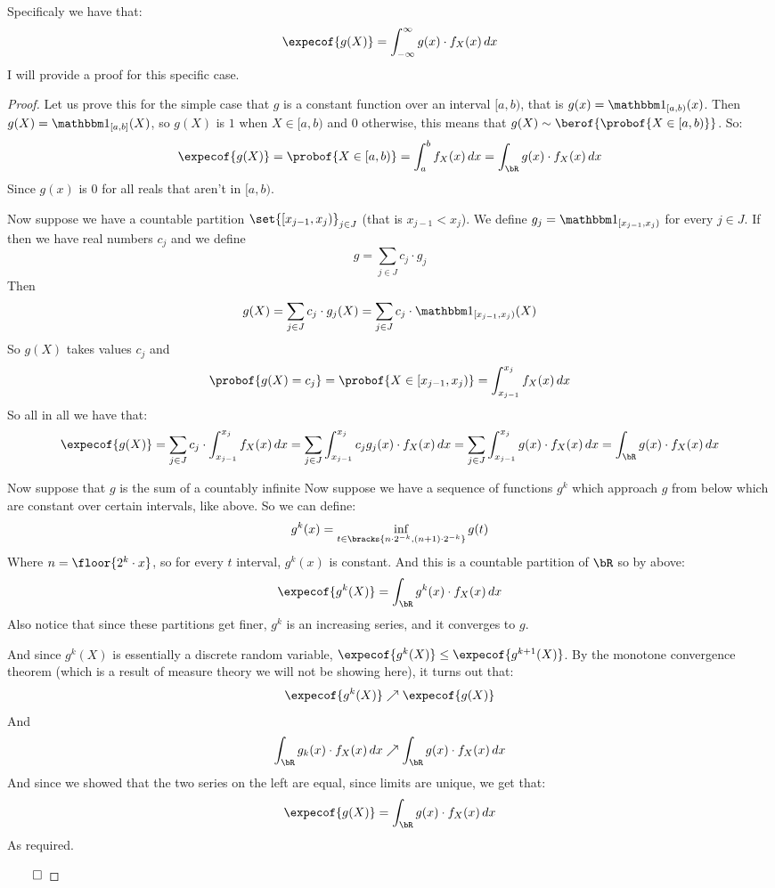 Specificaly we have that:
\[ \expecof{g(X)} = \int_{-\infty}^\infty g(x)\cdot f_X(x)\,dx \]
I will provide a proof for this specific case.

\begin{proof}

	Let us prove this for the simple case that $g$ is a constant function over an interval $[a,b)$, that is $g(x)=\bone_{[a,b)}(x)$.
	Then $g(X)=\bone_{[a,b]}(X)$, so $g(X)$ is $1$ when $X\in[a,b)$ and $0$ otherwise, this means that $g(X)\sim\berof{\probof{X\in[a,b)}}$.
	So:
	\[ \expecof{g(X)} = \probof{X\in[a,b)} = \int_a^b f_X(x)\,dx = \int_\bR g(x)\cdot f_X(x)\,dx \]
	Since $g(x)$ is $0$ for all reals that aren't in $[a,b)$.

	Now suppose we have a countable partition $\set{[x_{j-1},x_j)}_{j\in J}$ (that is $x_{j-1}<x_j$).
	We define $g_j=\bone_{[x_{j-1},x_j)}$ for every $j\in J$.
	If then we have real numbers $c_j$ and we define
	\[ g = \sum_{j\in J} c_j\cdot g_j \]
	Then 
	\[ g(X) = \sum_{j\in J} c_j\cdot g_j(X) = \sum_{j\in J} c_j\cdot\bone_{[x_{j-1},x_j)}(X) \]
	So $g(X)$ takes values $c_j$ and 
	\[ \probof{g(X)=c_j} = \probof{X\in[x_{j-1},x_j)} = \int_{x_{j-1}}^{x_j}f_X(x)\,dx \]
	So all in all we have that:
	\[ \expecof{g(X)} = \sum_{j\in J} c_j\cdot\int_{x_{j-1}}^{x_j}f_X(x)\,dx = \sum_{j\in J}\int_{x_{j-1}}^{x_j} c_jg_j(x)\cdot f_X(x)\,dx =
	\sum_{j\in J} \int_{x_{j-1}}^{x_j}g(x)\cdot f_X(x)\,dx = \int_\bR g(x)\cdot f_X(x)\,dx \]

	Now suppose that $g$ is the sum of a countably infinite 
	Now suppose we have a sequence of functions $g^k$ which approach $g$ from below which are constant over certain intervals, like above.
	So we can define:
	\[ g^k(x) = \inf_{t\in\bracks{n\cdot 2^{-k}, (n+1)\cdot 2^{-k}}} g(t) \]
	Where $n=\floor{2^k\cdot x}$, so for every $t$ interval, $g^k(x)$ is constant.
	And this is a countable partition of $\bR$ so by above:
	\[ \expecof{g^k(X)} = \int_\bR g^k(x)\cdot f_X(x)\,dx \]
	Also notice that since these partitions get finer, $g^k$ is an increasing series, and it converges to $g$.

	And since $g^k(X)$ is essentially a discrete random variable, $\expecof{g^k(X)}\leq\expecof{g^{k+1}(X)}$.
	By the monotone convergence theorem (which is a result of measure theory we will not be showing here), it turns out that:
	\[ \expecof{g^k(X)} \nearrow \expecof{g(X)} \]
	And
	\[ \int_\bR g_k(x)\cdot f_X(x)\,dx \nearrow \int_\bR g(x)\cdot f_X(x)\,dx \]
	And since we showed that the two series on the left are equal, since limits are unique, we get that:
	\[ \expecof{g(X)} = \int_\bR g(x)\cdot f_X(x)\,dx \]
	As required.

	\hfill$\qed$

\end{proof}

